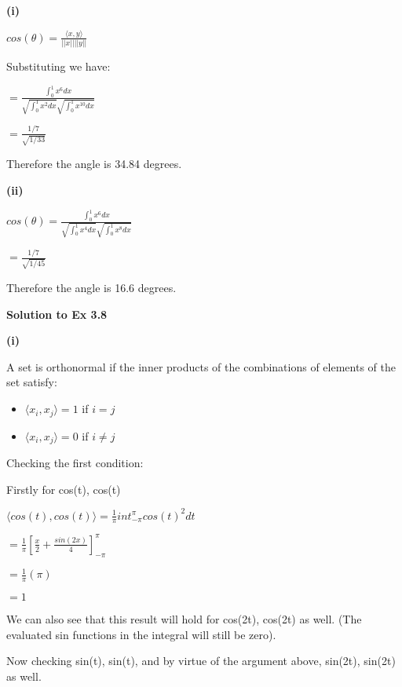 \documentclass[letterpaper,12pt]{article}
\theoremstyle{definition}
\begin{document}
\begin{spacing}{1.3}{}
	\setlength{\leftskip}{10pt}
	
	\textbf{(i)}
	
	\setlength{\leftskip}{20pt}
	
	$cos(\theta) = \frac{\langle x, y \rangle}{||x|| ||y||}$
	
	Substituting we have:
	
	$= \frac{\int_{0}^{1} x^6 dx}{\sqrt{\int_{0}^{1} x^2 dx}\sqrt{\int_{0}^{1} x^10 dx}}$
	
	$= \frac{1/7}{\sqrt{1/33}}$
	
	Therefore the angle is 34.84 degrees.
	
	\setlength{\leftskip}{10pt}
	
	\textbf{(ii)}
	
	\setlength{\leftskip}{20pt}
	
	$cos(\theta) = \frac{\int_{0}^{1}x^6 dx}{\sqrt{\int_{0}^{1}x^4 dx}\sqrt{\int_{0}^{1}x^8 dx}}$
	
	$= \frac{1/7}{\sqrt{1/45}}$
	
	Therefore the angle is 16.6 degrees.
	
	\setlength{\leftskip}{0pt}
	
	\textbf{Solution to Ex 3.8}
	
	\setlength{\leftskip}{10pt}
	
	\textbf{(i)}
	
	\setlength{\leftskip}{20pt}
	
	A set is orthonormal if the inner products of the combinations of elements of the set satisfy: \begin{itemize} \item $\langle x_{i}, x_{j} \rangle = 1$ if $i=j$ \item $\langle x_{i}, x_{j} \rangle = 0$ if $i \neq j$ \end{itemize}
	
	Checking the first condition:
	
	Firstly for cos(t), cos(t)
	
	$\langle cos(t), cos(t) \rangle = \frac{1}{\pi}int_{-\pi}^{\pi} cos(t)^2 dt$
	
	$= \frac{1}{\pi}[\frac{x}{2} + \frac{sin(2x)}{4}]_{-\pi}^{\pi}$
	
	$= \frac{1}{\pi}(\pi)$
	
	$=1$
	
	We can also see that this result will hold for cos(2t), cos(2t) as well. (The evaluated sin functions in the integral will still be zero).
	
	Now checking sin(t), sin(t), and by virtue of the argument above, sin(2t), sin(2t) as well.
	

\end{spacing}
\end{document}

